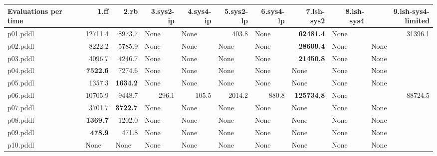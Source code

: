 \documentclass{article}
\begin{document}
\begin{tabular}{@{}lrrrrrrrrr@{}}
Evaluations per time & 1.ff & 2.rb & 3.sys2-ip & 4.sys4-ip & 5.sys2-lp & 6.sys4-lp & 7.lsh-sys2 & 8.lsh-sys4 & 9.lsh-sys4-limited \\
\midrule
p01.pddl & 12711.4 & 8973.7 & \multicolumn{1}{|l|}{None} & \multicolumn{1}{|l|}{None} & 403.8 & \multicolumn{1}{|l|}{None} & \textbf{62481.4} & \multicolumn{1}{|l|}{None} & 31396.1 \\
p02.pddl & 8222.2 & 5785.9 & \multicolumn{1}{|l|}{None} & \multicolumn{1}{|l|}{None} & \multicolumn{1}{|l|}{None} & \multicolumn{1}{|l|}{None} & \textbf{28609.4} & \multicolumn{1}{|l|}{None} & \multicolumn{1}{|l|}{None} \\
p03.pddl & 4096.7 & 4246.7 & \multicolumn{1}{|l|}{None} & \multicolumn{1}{|l|}{None} & \multicolumn{1}{|l|}{None} & \multicolumn{1}{|l|}{None} & \textbf{21450.8} & \multicolumn{1}{|l|}{None} & \multicolumn{1}{|l|}{None} \\
p04.pddl & \textbf{7522.6} & 7274.6 & \multicolumn{1}{|l|}{None} & \multicolumn{1}{|l|}{None} & \multicolumn{1}{|l|}{None} & \multicolumn{1}{|l|}{None} & \multicolumn{1}{|l|}{None} & \multicolumn{1}{|l|}{None} & \multicolumn{1}{|l|}{None} \\
p05.pddl & 1357.3 & \textbf{1634.2} & \multicolumn{1}{|l|}{None} & \multicolumn{1}{|l|}{None} & \multicolumn{1}{|l|}{None} & \multicolumn{1}{|l|}{None} & \multicolumn{1}{|l|}{None} & \multicolumn{1}{|l|}{None} & \multicolumn{1}{|l|}{None} \\
p06.pddl & 10705.9 & 9448.7 & 296.1 & 105.5 & 2014.2 & 880.8 & \textbf{125734.8} & \multicolumn{1}{|l|}{None} & 88724.5 \\
p07.pddl & 3701.7 & \textbf{3722.7} & \multicolumn{1}{|l|}{None} & \multicolumn{1}{|l|}{None} & \multicolumn{1}{|l|}{None} & \multicolumn{1}{|l|}{None} & \multicolumn{1}{|l|}{None} & \multicolumn{1}{|l|}{None} & \multicolumn{1}{|l|}{None} \\
p08.pddl & \textbf{1369.7} & 1202.0 & \multicolumn{1}{|l|}{None} & \multicolumn{1}{|l|}{None} & \multicolumn{1}{|l|}{None} & \multicolumn{1}{|l|}{None} & \multicolumn{1}{|l|}{None} & \multicolumn{1}{|l|}{None} & \multicolumn{1}{|l|}{None} \\
p09.pddl & \textbf{478.9} & 471.8 & \multicolumn{1}{|l|}{None} & \multicolumn{1}{|l|}{None} & \multicolumn{1}{|l|}{None} & \multicolumn{1}{|l|}{None} & \multicolumn{1}{|l|}{None} & \multicolumn{1}{|l|}{None} & \multicolumn{1}{|l|}{None} \\
p10.pddl & \multicolumn{1}{|l|}{None} & \multicolumn{1}{|l|}{None} & \multicolumn{1}{|l|}{None} & \multicolumn{1}{|l|}{None} & \multicolumn{1}{|l|}{None} & \multicolumn{1}{|l|}{None} & \multicolumn{1}{|l|}{None} & \multicolumn{1}{|l|}{None} & \multicolumn{1}{|l|}{None} \\

\end{tabular}
\end{document}
